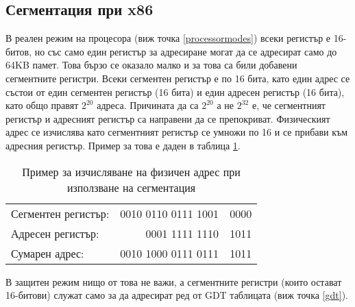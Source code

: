   \subsection{Сегментация при x86} \label{segmentation}
  В реален режим на процесора (виж точка \ref{processormodes}) всеки регистър е 16-битов, но със само един регистър за адресиране могат да се адресират само до 64KB памет. Това бързо се оказало малко и за това са били добавени сегментните регистри. Всеки сегментен регистър е по 16 бита, като един адрес се състои от един сегментен регистър (16 бита) и един адресен регистър (16 бита), като общо правят $2^{20}$ адреса.\cite[глава~2.1.1]{intel-manual-1} Причината да са $2^{20}$ а не $2^{32}$ е, че сегментният регистър и адресният регистър са направени да се препокриват. Физическият адрес се изчислява като сегментният регистър се умножи по 16 и се прибави към адресния регистър. Пример за това е даден в таблица \ref{tab:segmentation-calculation}.
  \begin{table}[htpb]
    \centering
    \begin{tabular}{l r@{\hskip 3pt}l}
      Сегментен регистър: & 0010 0110 0111 1001 & \color{gray}0000 \\
      Адресен регистър: & 0001 1111 1110 & 1011 \\
      \hline
      Сумарен адрес: & 0010 1000 0111 0111 & 1011 \\
    \end{tabular}
    \caption{Пример за изчисляване на физичен адрес при използване на сегментация}
    \label{tab:segmentation-calculation}
  \end{table}

  В защитен режим нищо от това не важи, а сегментните регистри (които остават 16-битови) служат само за да адресират ред от GDT таблицата (виж точка \ref{gdt}).


